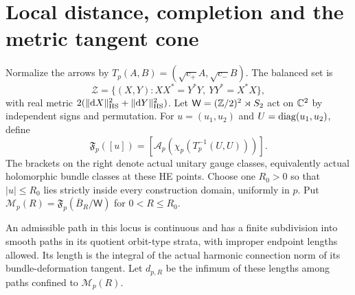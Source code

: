 \section{Local distance, completion and the metric tangent cone}
\label{sec:metric-cone}

Normalize the arrows by $T_p(A,B)=(\sqrt{c_+}A,\sqrt{c_-}B)$.
The balanced set is
\[
 \mathcal Z=\{(X,Y):XX^*=Y^*Y,\ YY^*=X^*X\},
\]
with real metric $2(\|\mathrm d X\|_{\rm HS}^2+\|\mathrm d Y\|_{\rm HS}^2)$.
Let $\mathsf W=(\mathbb Z/2)^2\rtimes S_2$ act on $\mathbb C^2$
by independent signs and permutation. For
$u=(u_1,u_2)$ and $U=\operatorname{diag}(u_1,u_2)$, define
\begin{equation}\label{eq:actual-moduli-parametrization}
 \mathfrak F_p([u])=
       [\mathcal A_p(\chi_p(T_p^{-1}(U,U)))].
\end{equation}
The brackets on the right denote actual unitary gauge
classes, equivalently actual holomorphic bundle classes
at these HE points.
Choose one $R_0>0$ so that $|u|\le R_0$ lies strictly
inside every construction domain, uniformly in $p$.
Put $\mathcal M_p(R)=\mathfrak F_p(\overline B_R/\mathsf W)$
for $0<R\le R_0$.

An admissible path in this locus is continuous and has
a finite subdivision into smooth paths in its quotient
orbit-type strata, with improper endpoint lengths allowed.
Its length is the integral of the actual harmonic
connection norm of its bundle-deformation tangent.
Let $d_{p,R}$ be the infimum of these lengths among
paths confined to $\mathcal M_p(R)$.

